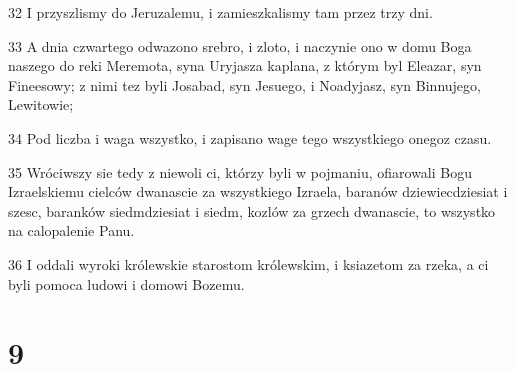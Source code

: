 \par 32 I przyszlismy do Jeruzalemu, i zamieszkalismy tam przez trzy dni.
\par 33 A dnia czwartego odwazono srebro, i zloto, i naczynie ono w domu Boga naszego do reki Meremota, syna Uryjasza kaplana, z którym byl Eleazar, syn Fineesowy; z nimi tez byli Josabad, syn Jesuego, i Noadyjasz, syn Binnujego, Lewitowie;
\par 34 Pod liczba i waga wszystko, i zapisano wage tego wszystkiego onegoz czasu.
\par 35 Wróciwszy sie tedy z niewoli ci, którzy byli w pojmaniu, ofiarowali Bogu Izraelskiemu cielców dwanascie za wszystkiego Izraela, baranów dziewiecdziesiat i szesc, baranków siedmdziesiat i siedm, kozlów za grzech dwanascie, to wszystko na calopalenie Panu.
\par 36 I oddali wyroki królewskie starostom królewskim, i ksiazetom za rzeka, a ci byli pomoca ludowi i domowi Bozemu.

\chapter{9}

